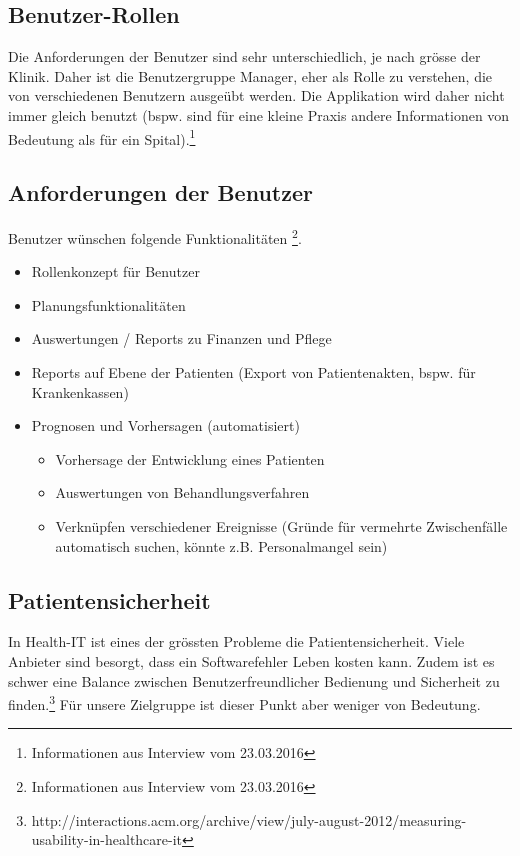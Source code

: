 \documentclass[a4paper]{scrreprt}
\begin{document}
\subsection{Benutzer-Rollen}
Die Anforderungen der Benutzer sind sehr unterschiedlich, je nach grösse der Klinik. Daher ist die Benutzergruppe Manager, eher als Rolle zu verstehen, die von verschiedenen Benutzern ausgeübt werden. Die Applikation wird daher nicht immer gleich benutzt (bspw. sind für eine kleine Praxis andere Informationen von Bedeutung als für ein Spital).\footnote{Informationen aus Interview vom 23.03.2016}


\subsection{Anforderungen der Benutzer}
Benutzer wünschen folgende Funktionalitäten \footnote{Informationen aus Interview vom 23.03.2016}.
\begin{itemize}
\item Rollenkonzept für Benutzer
\item Planungsfunktionalitäten
\item Auswertungen / Reports zu Finanzen und Pflege
\item Reports auf Ebene der Patienten (Export von Patientenakten, bspw. für Krankenkassen)
\item Prognosen und Vorhersagen (automatisiert)
\begin{itemize}
\item Vorhersage der Entwicklung eines Patienten
\item Auswertungen von Behandlungsverfahren
\item Verknüpfen verschiedener Ereignisse (Gründe für vermehrte Zwischenfälle automatisch suchen, könnte z.B. Personalmangel sein)
\end{itemize}
\end{itemize}


\subsection{Patientensicherheit}
In Health-IT ist eines der grössten Probleme die Patientensicherheit. Viele Anbieter sind besorgt, dass ein Softwarefehler Leben kosten kann. Zudem ist es schwer eine Balance zwischen Benutzerfreundlicher Bedienung und Sicherheit zu finden.\footnote{http://interactions.acm.org/archive/view/july-august-2012/measuring-usability-in-healthcare-it}
Für unsere Zielgruppe ist dieser Punkt aber weniger von Bedeutung.
\end{document}
